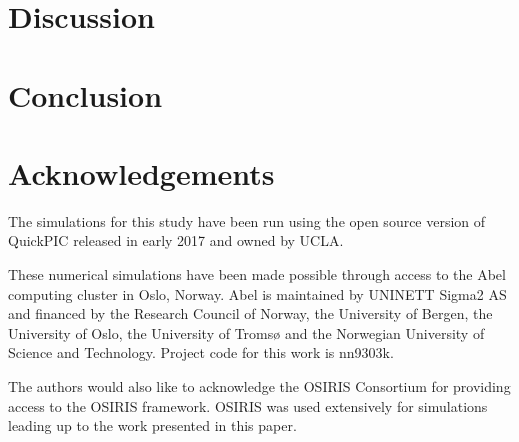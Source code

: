 \documentclass[aps,prstab,reprint,amsmath,amssymb,groupedaddress]{revtex4-1}
\begin{document}
\section[\label{S:D}]{Discussion}

\section[\label{S:C}]{Conclusion}

\section[\label{Ack}]{Acknowledgements}

The simulations for this study have been run using the open source version of QuickPIC released in early 2017 and owned
by UCLA.

These numerical simulations have been made possible through access to the Abel computing cluster in Oslo, Norway. Abel
is maintained by UNINETT Sigma2 AS and financed by the Research Council of Norway, the University of Bergen, the
University of Oslo, the University of Tromsø and the Norwegian University of Science and Technology. Project code for
this work is nn9303k.

The authors would also like to acknowledge the OSIRIS Consortium for providing access to the OSIRIS framework. OSIRIS
was used extensively for simulations leading up to the work presented in this paper.


\end{document}

